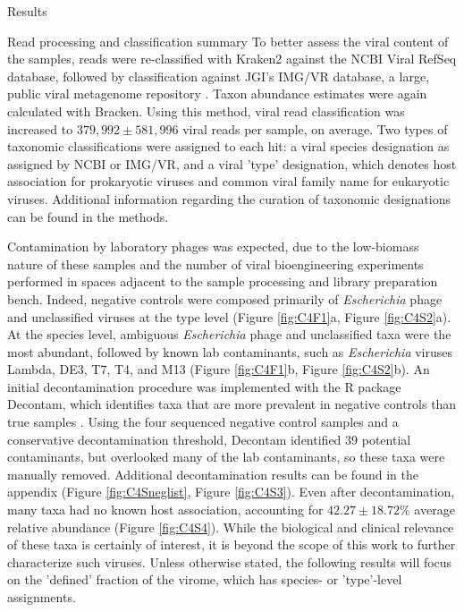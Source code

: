 \documentclass[oneside,12pt,final]{sty/ucthesis-CA2012}
\begin{document}
\begin{mainmatter}
\begin{section}{Results}
\begin{subsection}{Read processing and classification summary}
To better assess the viral content of the samples, reads were re-classified with Kraken2 against the NCBI Viral RefSeq database, followed by classification against JGI's IMG/VR database, a large, public viral metagenome repository \cite{RN175, RN78}. Taxon abundance estimates were again calculated with Bracken. Using this method, viral read classification was increased to $379,992 \pm 581,996$ viral reads per sample, on average. Two types of taxonomic classifications were assigned to each hit: a viral species designation as assigned by NCBI or IMG/VR, and a viral 'type' designation, which denotes host association for prokaryotic viruses and common viral family name for eukaryotic viruses. Additional information regarding the curation of taxonomic designations can be found in the methods.

Contamination by laboratory phages was expected, due to the low-biomass nature of these samples and the number of viral bioengineering experiments performed in spaces adjacent to the sample processing and library preparation bench. Indeed, negative controls were composed primarily of \textit{Escherichia} phage and unclassified viruses at the type level (Figure \ref{fig:C4F1}a, Figure \ref{fig:C4S2}a). At the species level, ambiguous \textit{Escherichia} phage and unclassified taxa were the most abundant, followed by known lab contaminants, such as \textit{Escherichia} viruses Lambda, DE3, T7, T4, and M13 (Figure \ref{fig:C4F1}b, Figure \ref{fig:C4S2}b). An initial decontamination procedure was implemented with the R package Decontam, which identifies taxa that are more prevalent in negative controls than true samples \cite{RN177}. Using the four sequenced negative control samples and a conservative decontamination threshold, Decontam identified 39 potential contaminants, but overlooked many of the lab contaminants, so these taxa were manually removed. Additional decontamination results can be found in the appendix (Figure \ref{fig:C4Sneglist}, Figure \ref{fig:C4S3}). Even after decontamination, many taxa had no known host association, accounting for $42.27 \pm 18.72\%$ average relative abundance (Figure \ref{fig:C4S4}). While the biological and clinical relevance of these taxa is certainly of interest, it is beyond the scope of this work to further characterize such viruses. Unless otherwise stated, the following results will focus on the 'defined' fraction of the virome, which has  species- or 'type'-level assignments.


\end{subsection}
\end{section}
\end{mainmatter}
\end{document}
